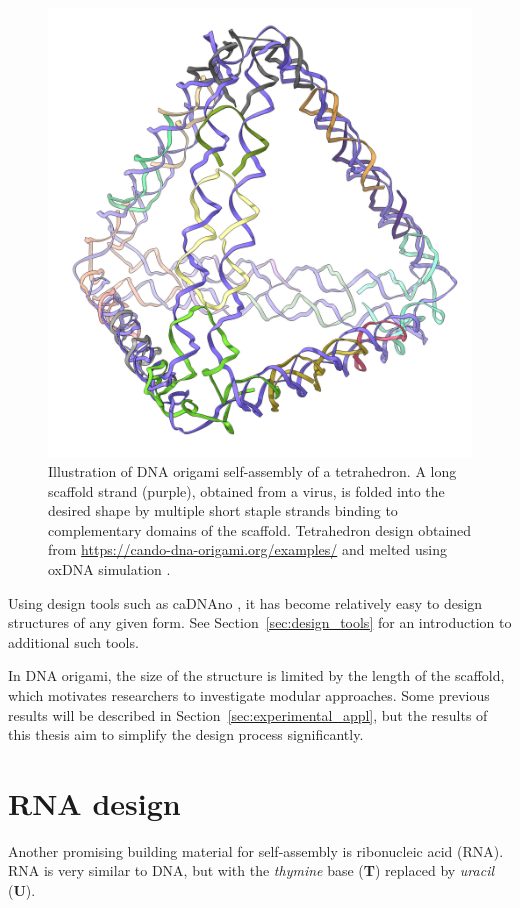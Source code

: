 \begin{figure}
    \centering\includegraphics[width=\textwidth/3]{figures/melt/assembled.png}
    \caption{Illustration of DNA origami self-assembly of a tetrahedron. A long scaffold strand (purple), obtained from a virus, is folded into the desired shape by multiple short staple strands binding to complementary domains of the scaffold. Tetrahedron design obtained from \url{https://cando-dna-origami.org/examples/} and melted using oxDNA simulation \cite{ouldridge2010dna}.
    }
    \label{fig:dnaOrigami}
\end{figure}

Using design tools such as caDNAno \cite{cadnano}, it has become relatively easy to design structures of any given form. See Section~\ref{sec:design_tools} for an introduction to additional such tools.

In DNA origami, the size of the structure is limited by the length of the scaffold, which motivates researchers to investigate modular approaches. Some previous results will be described in Section~\ref{sec:experimental_appl}, but the results of this thesis aim to simplify the design process significantly.

\section{RNA design}
\label{sec:RNA_design}
Another promising building material for self-assembly is ribonucleic acid (RNA). RNA is very similar to DNA, but with the \emph{thymine} base (\textbf{T}) replaced by \emph{uracil} (\textbf{U}).

